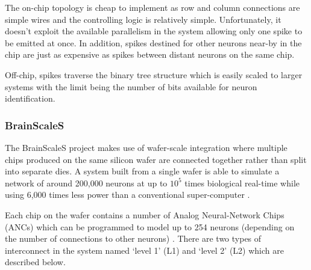 				The on-chip topology is cheap to implement as row and column connections
				are simple wires and the controlling logic is relatively simple.
				Unfortunately, it doesn't exploit the available parallelism in the
				system allowing only one spike to be emitted at once. In addition,
				spikes destined for other neurons near-by in the chip are just as
				expensive as spikes between distant neurons on the same chip.
				
				Off-chip, spikes traverse the binary tree structure which is easily
				scaled to larger systems with the limit being the number of bits
				available for neuron identification.
			
			\subsubsection{BrainScaleS}
				
				
				The BrainScaleS project makes use of wafer-scale integration where
				multiple chips produced on the same silicon wafer are connected together
				rather than split into separate dies. A system built from a single wafer
				is able to simulate a network of around 200,000 neurons at up to $10^5$
				times biological real-time while using 6,000 times less power than a
				conventional super-computer \cite{schemmel08}.
				
				Each chip on the wafer contains a number of Analog Neural-Network Chips
				(ANCs) which can be programmed to model up to 254 neurons (depending on
				the number of connections to other neurons) \cite{schemmel10}. There are
				two types of interconnect in the system named `level 1' (L1) and `level
				2' (L2) which are described below.
			
